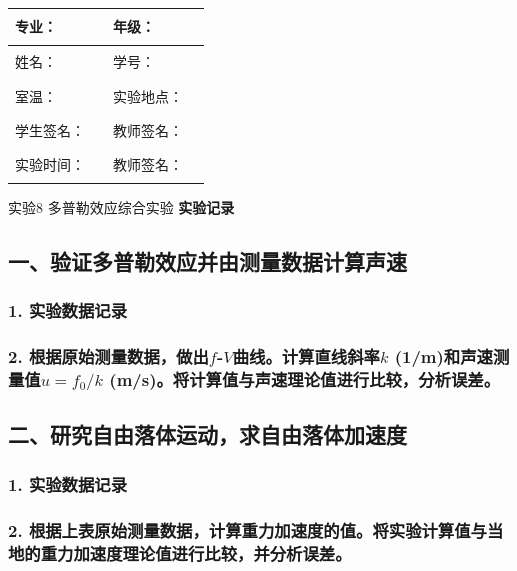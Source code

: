 \documentclass[dvipsnames, svgnames,a4paper,11pt]{article}
\newcommand{\recordblank}[1]{\par\vspace*{#1}\par}
\begin{document}
\clearpage
\noindent\begin{minipage}{\textwidth}
	\renewcommand\arraystretch{1.7}
	\begin{tabularx}{\textwidth}{|X|X|X|X|}
	\hline
	专业：& \rule{2.5cm}{0.4pt} & 年级：& \rule{2.5cm}{0.4pt}\\
	\hline
	姓名：& \rule{2.5cm}{0.4pt} & 学号：& \rule{2.5cm}{0.4pt}\\
	\hline
	室温：& \rule{2.5cm}{0.4pt} & 实验地点：& \rule{2.5cm}{0.4pt}\\
	\hline
	学生签名：& \rule{2.5cm}{0.4pt} & 教师签名：& \rule{2.5cm}{0.4pt}\\
	\hline
	实验时间：& \rule{2.5cm}{0.4pt} & 教师签名：& \rule{2.5cm}{0.4pt}\\
	\hline
	\end{tabularx}
\vspace{0.8em}
{}
\begin{center}
	\LARGE 实验8 多普勒效应综合实验 \hspace{11pt} \textbf{实验记录}
\end{center}
\subsection{一、验证多普勒效应并由测量数据计算声速}

\subsubsection{1. 实验数据记录}
\recordblank{5.0cm}
\end{minipage}

\subsubsection{2. 根据原始测量数据，做出$f$-$V$曲线。计算直线斜率$k$ (1/m)和声速测量值$u=f_0/k$ (m/s)。将计算值与声速理论值进行比较，分析误差。}
\recordblank{5.0cm}
\subsection{二、研究自由落体运动，求自由落体加速度}

\subsubsection{1. 实验数据记录}
\recordblank{9.8cm}
\subsubsection{2. 根据上表原始测量数据，计算重力加速度的值。将实验计算值与当地的重力加速度理论值进行比较，并分析误差。}
\recordblank{5.0cm}
\end{document}
